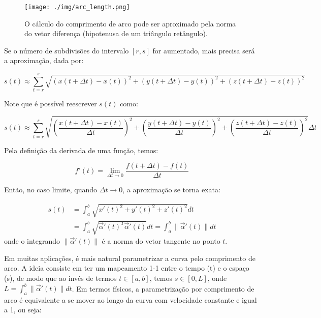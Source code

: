 \documentclass[a4paper,12pt]{article}
\begin{document}
\begin{figure}[ht]
\begin{center}
\centerline{\texttt{[image: ./img/arc\_length.png]}}
\caption{O cálculo do comprimento de arco pode ser aproximado pela norma do vetor diferença (hipotenusa de um triângulo retângulo).}
\label{fig:arc_length}
\end{center}
\end{figure}

Se o número de subdivisões do intervalo $[r, s]$ for aumentado, mais precisa será a aproximação, dada por:

\begin{equation}
	s(t) \approx \sum_{t=r}^{s} \sqrt{ \left( x(t+\Delta t) - x(t) \right)^2 + \left( y(t+\Delta t) - y(t) \right)^2 + \left( z(t+\Delta t) - z(t) \right)^2 }
\end{equation}

Note que é possível reescrever $s(t)$ como:

\begin{equation}
	s(t) \approx \sum_{t=r}^{s} \sqrt{ \left( \frac{x(t+\Delta t) - x(t)}{\Delta t} \right)^2 + \left( \frac{y(t+\Delta t) - y(t)}{\Delta t} \right)^2 + \left( \frac{z(t+\Delta t) - z(t)}{\Delta t} \right)^2 } \Delta t
\end{equation}

Pela definição da derivada de uma função, temos:

\begin{equation}
	f'(t) = \lim\limits_{\Delta t \to 0} \frac{f(t+\Delta t) - f(t)}{\Delta t}
\end{equation}

Então, no caso limite, quando $\Delta t \to 0$, a aproximação se torna exata:

\begin{align}
	s(t) & = \int_{a}^{b} \sqrt{ x'(t)^2 + y'(t)^2 + z'(t)^2 } dt \\ \nonumber & = \int_{a}^{b} \sqrt{ \vec{\alpha}'(t)^T \vec{\alpha}'(t)  } dt = \int_{a}^{b} \lVert \vec{\alpha}'(t) \rVert dt
\end{align} onde o integrando $\lVert \vec{\alpha}'(t) \rVert$ é a norma do vetor tangente no ponto $t$.

Em muitas aplicações, é mais natural parametrizar a curva pelo comprimento de arco. A ideia consiste em ter um mapeamento 1-1 entre o tempo (t) e o espaço (s), de modo que ao invés de termos $t \in [a, b]$, temos $s \in [0, L]$, onde $L = \int_{a}^{b} \lVert \vec{\alpha}'(t) \rVert dt$. Em termos físicos, a parametrização por comprimento de arco é equivalente a se mover ao longo da curva com velocidade constante e igual a 1, ou seja:
\end{document}
